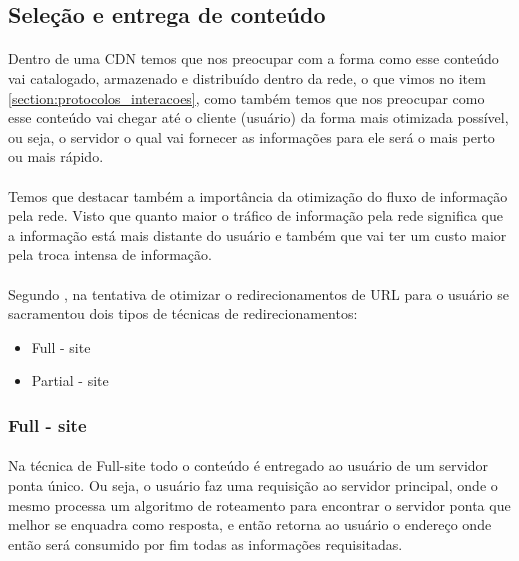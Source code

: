 \subsection{Sele\c{c}\~ao e entrega de conte\'udo}
\paragraph{} Dentro de uma CDN temos que  nos preocupar com a forma como esse conte\'udo vai catalogado, armazenado e distribu\'ido dentro da rede, o que vimos no item \ref{section:protocolos_interacoes}, como tamb\'em temos que nos preocupar como esse conte\'udo vai chegar at\'e o cliente (usu\'ario) da forma mais otimizada poss\'ivel, ou seja, o servidor o qual vai fornecer as informa\c{c}\~oes para ele ser\'a o mais perto ou mais r\'apido. 
\paragraph{} Temos que destacar tamb\'em a import\^ancia da otimiza\c{c}\~ao do fluxo de informa\c{c}\~ao pela rede. Visto que quanto maior o tr\'afico de informa\c{c}\~ao pela rede significa que a informa\c{c}\~ao est\'a mais distante do usu\'ario e tamb\'em que vai ter um custo maior pela troca intensa de informa\c{c}\~ao. 
\paragraph{} Segundo \cite{krishnamurthy2001use}, na tentativa de otimizar o redirecionamentos de URL para o usu\'ario se sacramentou dois tipos de t\'ecnicas de redirecionamentos:
\begin{itemize}
	\item Full - site
	\item Partial - site
\end{itemize}

\subsubsection{Full - site}
\paragraph{} Na t\'ecnica de Full-site todo o conte\'udo \'e entregado ao usu\'ario de um servidor ponta \'unico. Ou seja, o usu\'ario faz uma requisi\c{c}\~ao ao servidor principal, onde o mesmo processa um algoritmo de roteamento para encontrar o servidor ponta que melhor se enquadra como resposta, e ent\~ao retorna ao usu\'ario o endere\c{c}o onde ent\~ao ser\'a consumido por fim todas as informa\c{c}\~oes requisitadas. 

